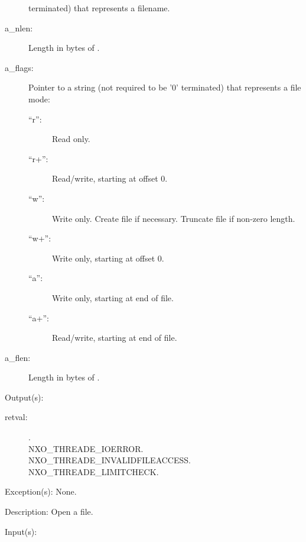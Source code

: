 \begin{capi}
\begin{capilist}
\begin{description}
			terminated) that represents a filename.
		\item[a\_nlen: ]
			Length in bytes of .
		\item[a\_flags: ]
			Pointer to a string (not required to be '{\bs}0'
			terminated) that represents a file mode:
			\begin{description}\item[]
			\item[``r'': ]
				Read only.
			\item[``r+'': ]
				Read/write, starting at offset 0.
			\item[``w'': ]
				Write only.  Create file if necessary.  Truncate
				file if non-zero length.
			\item[``w+'': ]
				Write only, starting at offset 0.
			\item[``a'': ]
				Write only, starting at end of file.
			\item[``a+'': ]
				Read/write, starting at end of file.
			\end{description}
		\item[a\_flen: ]
			Length in bytes of .
		\end{description}
	\item[Output(s): ]
		\begin{description}\item[]
		\item[retval: ]
			\begin{description}\item[]
			\item[.]
			\item[
				{NXO_THREADE_IOERROR}.]
			\item[
				{NXO_THREADE_INVALIDFILEACCESS}.]
			\item[
				{NXO_THREADE_LIMITCHECK}.]
			\end{description}
		\end{description}
	\item[Exception(s): ] None.
	\item[Description: ]
		Open a file.
	\end{capilist}
\label{nxo_file_close}
	\begin{capilist}
	\item[Input(s): ]
		\begin{description}\item[]

\end{description}
\end{capilist}
\end{capi}
